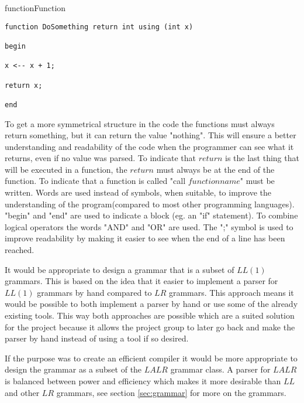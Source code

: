 \begin{code}{function}{Function}
\begin{lstlisting}
function DoSomething return int using (int x)

begin

x <-- x + 1;

return x;

end
\end{lstlisting}
\end{code}
To get a more symmetrical structure in the code the functions must always return something, but it can return the value "nothing". This will ensure a better understanding and readability of the code when the programmer can see what it returns, even if no value was parsed. To indicate that $return$ is the last thing that will be executed in a function, the $return$ must always be at the end of the function. To indicate that a function is called "call $functionname$" must be written.
Words are used instead of symbols, when suitable, to improve the understanding of the program(compared to most other programming languages).
"begin" and "end" are used to indicate a block (eg. an "if" statement). To combine logical operators the words "AND" and "OR" are used. The ";" symbol is used to improve readability by making it easier to see when the end of a line has been reached.

It would be appropriate to design a grammar that is a subset of $LL(1)$ grammars. This is based on the idea that it easier to implement a parser for $LL(1)$ grammars by hand compared to $LR$ grammars. This approach means it would be possible to both implement a parser by hand or use some of the already existing tools. This way both approaches are possible which are a suited solution for the project because it allows the project group to later go back and make the parser by hand instead of using a tool if so desired.

If the purpose was to create an efficient compiler it would be more appropriate to design the grammar as a subset of the $LALR$ grammar class. A parser for $LALR$ is balanced between power and efficiency which makes it more desirable than $LL$ and other $LR$ grammars, see section \ref{sec:grammar} for more on the grammars. %
